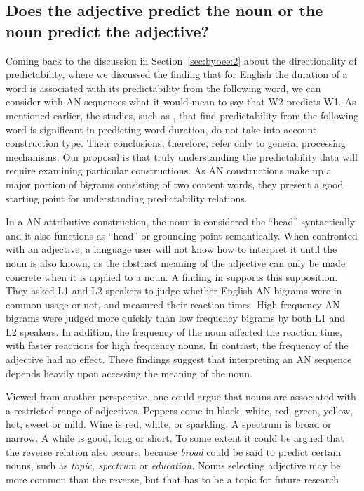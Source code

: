 \documentclass[output=paper]{langscibook}
\begin{document}
\subsection{Does the adjective predict the noun or the noun predict the adjective?}

Coming back to the discussion in Section~\ref{sec:bybee:2} about the directionality of predictability, where we discussed the finding that for English the duration of a word is associated with its predictability from the following word, we can consider with AN sequences what it would mean to say that W2 predicts W1. As mentioned earlier, the studies, such as \citet{BellJurafsky2009}, that find predictability from the following word is significant in predicting word duration, do not take into account construction type. Their conclusions, therefore, refer only to general processing mechanisms. Our proposal is that truly understanding the predictability data will require examining particular constructions. As AN constructions make up a major portion of bigrams consisting of two content words, they present a good starting point for understanding predictability relations. 

In a AN attributive construction, the noun is considered the ``head'' syntactically and it also functions as ``head'' or grounding point semantically. When confronted with an adjective, a language user will not know how to interpret it until the noun is also known, as the abstract meaning of the adjective can only be made concrete when it is applied to a noun. A finding in \citet{ÖksüzRebuschat2020} supports this supposition. They asked L1 and L2 speakers to judge whether English AN bigrams were in common usage or not, and measured their reaction times. High frequency AN bigrams were judged more quickly than low frequency bigrams by both L1 and L2 speakers. In addition, the frequency of the noun affected the reaction time, with faster reactions for high frequency nouns. In contrast, the frequency of the adjective had no effect. These findings suggest that interpreting an AN sequence depends heavily upon accessing the meaning of the noun.

Viewed from another perspective, one could argue that nouns are associated with a restricted range of adjectives. Peppers come in black, white, red, green, yellow, hot, sweet or mild. Wine is red, white, or sparkling. A spectrum is broad or narrow. A while is good, long or short. To some extent it could be argued that the reverse relation also occurs, because \textit{broad} could be said to predict certain nouns, such as \textit{topic, spectrum} or \textit{education.} Nouns selecting adjective may be more common than the reverse, but that has to be a topic for future research
\end{document}

